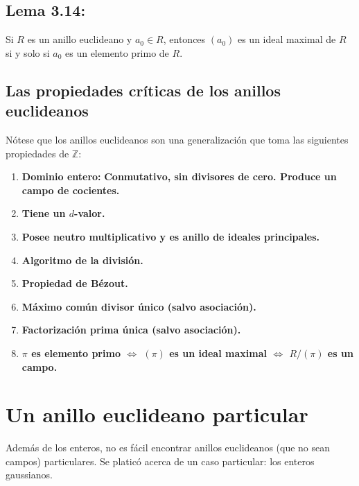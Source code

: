 \documentclass{article}
\begin{document}
\subsection*{\color{blue} Lema 3.14:}

Si $R$ es un anillo euclideano y $a_0\in R$, entonces $(a_0)$ es un ideal maximal de $R$ si y solo si $a_0$ es un elemento primo de $R$.

\subsection*{\color{purple} Las propiedades críticas de los anillos euclideanos}

Nótese que los anillos euclideanos son una generalización que toma las siguientes propiedades de $\mathbb{Z}$:

\begin{enumerate}
\item \textbf{Dominio entero:} \textbf{Conmutativo, sin divisores de cero. Produce un campo de cocientes.} 

\item \textbf{Tiene un $d$-valor.} 

\item \textbf{Posee neutro multiplicativo y es anillo de ideales principales.} 

\item \textbf{Algoritmo de la división.} 

\item \textbf{Propiedad de Bézout.} 

\item \textbf{Máximo común divisor único (salvo asociación).} 

\item \textbf{Factorización prima única (salvo asociación).} 

\item \textbf{$\pi$ es elemento primo $\iff$ $(\pi)$ es un ideal maximal $\iff$ $R/(\pi)$ es un campo.} 

\end{enumerate}

\newpage

\section{Un anillo euclideano particular}

Además de los enteros, no es fácil encontrar anillos euclideanos (que no sean campos) particulares. Se platicó acerca de un caso particular: los enteros gaussianos.
\end{document}
